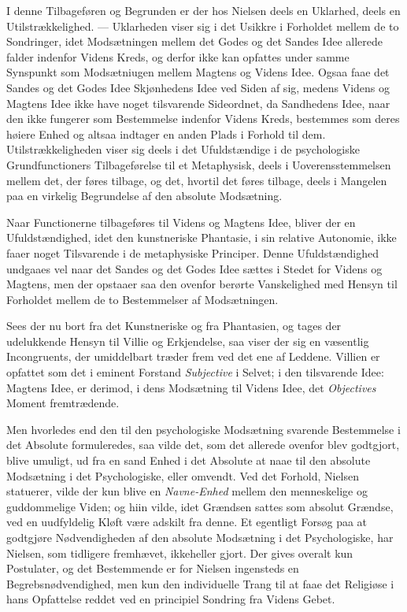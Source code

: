 \documentclass[12pt,a4paper]{book}
\newcommand{\opage}[1]{\marginnote{\footnotesize\textit{[#1]}}}
\begin{document}
I denne Tilbageføren og Begrunden er der hos Nielsen deels en Uklarhed, deels en
Utilstrækkelighed. --- Uklarheden viser sig i det Usikkre i Forholdet mellem de to
Sondringer, idet Modsætningen mellem det Godes og det Sandes Idee allerede falder indenfor
Videns Kreds, og derfor ikke kan opfattes under samme Synspunkt som Modsætniugen mellem Magtens og Videns Idee. Ogsaa faae det Sandes og det Godes Idee Skjønhedens Idee ved Siden
af sig, medens Videns og Magtens Idee ikke have noget tilsvarende Sideordnet, da Sandhedens
Idee, naar \opage{172}den ikke fungerer som Bestemmelse indenfor Videns Kreds, bestemmes som deres
høiere Enhed og altsaa indtager en anden Plads i Forhold til dem. Utilstrækkeligheden viser
sig deels i det Ufuldstændige i de psychologiske Grundfunctioners Tilbageførelse til et
Metaphysisk, deels i Uoverensstemmelsen mellem det, der føres tilbage, og det, hvortil det
føres tilbage, deels i Mangelen paa en virkelig Begrundelse af den absolute Modsætning.

Naar Functionerne tilbageføres til Videns og Magtens Idee, bliver der en Ufuldstændighed,
idet den kunstneriske Phantasie, i sin relative Autonomie, ikke faaer noget Tilsvarende i de
metaphysiske Principer. Denne Ufuldstændighed undgaaes vel naar det Sandes og det Godes Idee
sættes i Stedet for Videns og Magtens, men der opstaaer saa den ovenfor berørte
Vanskelighed med Hensyn til Forholdet mellem de to Bestemmelser af Modsætningen.

Sees der nu bort fra det Kunstneriske og fra Phantasien, og tages der udelukkende Hensyn til
Villie og Erkjendelse, saa viser der sig en væsentlig Incongruents, der umiddelbart træder
frem ved det ene af Leddene. Villien er opfattet som det i eminent Forstand \emph{Subjective}
i Selvet; i den tilsvarende Idee: Magtens Idee, er derimod, i dens Modsætning til Videns
Idee, det \emph{Objectives} Moment fremtrædende.

Men hvorledes end den til den psychologiske Modsætning svarende Bestemmelse i det Absolute
formuleredes, saa vilde det, som det allerede ovenfor blev godtgjort, blive umuligt, ud fra
en sand Enhed i det Absolute at naae til den absolute Modsætning i det Psychologiske, eller
omvendt. Ved det Forhold, Nielsen statuerer, vilde der kun blive en \emph{Navne-Enhed} mellem
den menneskelige og guddommelige Viden; og hiin vilde, idet Grændsen sattes som absolut
Grændse, ved en uudfyldelig Kløft være adskilt fra denne. Et egentligt Forsøg paa at
godtgjøre Nødvendigheden af den absolute Modsætning i det Psychologiske, har Nielsen, som
tidligere fremhævet, ikkeheller gjort. Der gives overalt kun Postulater, og det Bestemmende
er for Nielsen ingensteds \opage{173}en Begrebsnødvendighed, men kun den individuelle Trang til at faae
det Religiøse i hans Opfattelse reddet ved en principiel Sondring fra Videns Gebet.
\end{document}
